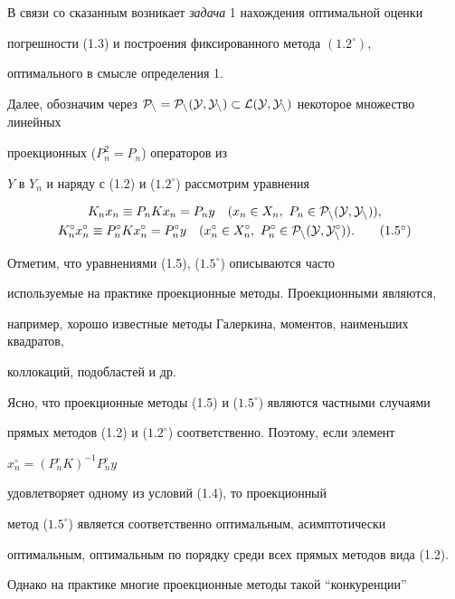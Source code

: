В связи со сказанным возникает {\it задача} 1 нахождения оптимальной оценки


погрешности (1.3) и построения фиксированного метода $(1.2^\circ)$,


оптимального в смысле определения 1.





Далее, обозначим через $\cal P_n=\cal P_n(Y,Y_n)\subset


\cal L(Y,Y_n)$ некоторое множество линейных


проекционных ($P_n^2=P_n$) операторов из


$Y$ в $Y_n$ и наряду с (1.2) и ($1.2^\circ$) рассмотрим уравнения


\begin{gather}


K_nx_n\equiv P_nKx_n=P_ny\quad (x_n\in X_n,\ P_n\in \cal P_n(Y,Y_n)), \\


%


K_n^\circ x_n^\circ \equiv P_n^\circ Kx_n^\circ =P_n^\circ y\quad


(x_n^\circ \in X_n^\circ,\ P_n^\circ \in


\cal P_n(Y,Y_n^\circ )).


\tag{$1.5^\circ$}


\end{gather}


Отметим, что уравнениями (1.5), ($1.5^\circ$) описываются часто


используемые на практике проекционные методы. Проекционными являются,


например, хорошо известные методы Галеркина, моментов, наименьших квадратов,


коллокаций, подобластей и др.


Ясно, что проекционные методы (1.5) и ($1.5^\circ$) являются частными случаями


прямых методов (1.2) и ($1.2^\circ$) соответственно. Поэтому, если элемент


$x_n^\circ =(P_n^\circ K)^{-1}P_n^\circ y$


удовлетворяет одному из условий (1.4), то проекционный


метод ($1.5^\circ$) является соответственно оптимальным, асимптотически


оптимальным, оптимальным по порядку среди всех прямых методов вида (1.2).


Однако на практике многие проекционные методы такой ``конкуренции''


